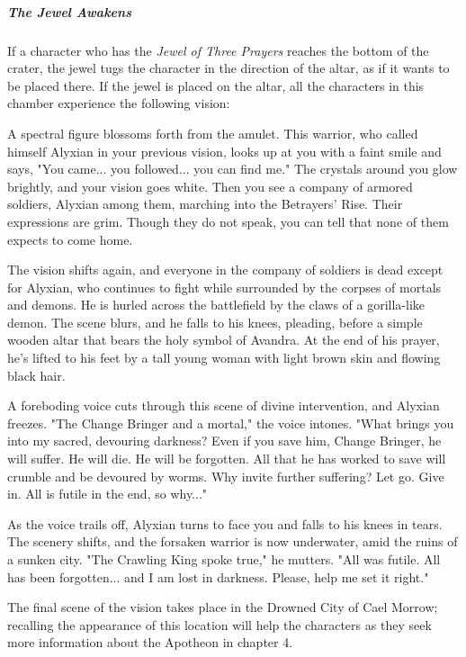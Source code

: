 \documentclass[10pt,a4paper,twoside,fancy,bg=print,twocolumn,openany,nodeprecatedcode]{dndbook}
\begin{document}
\subparagraph{The Jewel Awakens}
If a character who has the \textit{Jewel of Three Prayers} reaches the bottom of the crater, the jewel tugs the character in the direction of the altar, as if it wants to be placed there. If the jewel is placed on the altar, all the characters in this chamber experience the following vision:

\begin{DndReadAloud}{}
A spectral figure blossoms forth from the amulet. This warrior, who called himself Alyxian in your previous vision, looks up at you with a faint smile and says, "You came... you followed... you can find me." The crystals around you glow brightly, and your vision goes white. Then you see a company of armored soldiers, Alyxian among them, marching into the Betrayers' Rise. Their expressions are grim. Though they do not speak, you can tell that none of them expects to come home.

The vision shifts again, and everyone in the company of soldiers is dead except for Alyxian, who continues to fight while surrounded by the corpses of mortals and demons. He is hurled across the battlefield by the claws of a gorilla-like demon. The scene blurs, and he falls to his knees, pleading, before a simple wooden altar that bears the holy symbol of Avandra. At the end of his prayer, he's lifted to his feet by a tall young woman with light brown skin and flowing black hair.

A foreboding voice cuts through this scene of divine intervention, and Alyxian freezes. "The Change Bringer and a mortal," the voice intones. "What brings you into my sacred, devouring darkness? Even if you save him, Change Bringer, he will suffer. He will die. He will be forgotten. All that he has worked to save will crumble and be devoured by worms. Why invite further suffering? Let go. Give in. All is futile in the end, so why..."

As the voice trails off, Alyxian turns to face you and falls to his knees in tears. The scenery shifts, and the forsaken warrior is now underwater, amid the ruins of a sunken city. "The Crawling King spoke true," he mutters. "All was futile. All has been forgotten... and I am lost in darkness. Please, help me set it right."

\end{DndReadAloud}

The final scene of the vision takes place in the Drowned City of Cael Morrow; recalling the appearance of this location will help the characters as they seek more information about the Apotheon in chapter 4.
\end{document}
